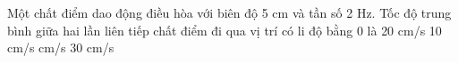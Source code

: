   
  \begin{ex}%
  	Một chất điểm dao động điều hòa với biên độ 5 cm và tần số 2 Hz. Tốc độ trung bình giữa hai lần liên tiếp chất điểm đi qua vị trí có li độ bằng 0 là
  	\choice
  	{20 cm/s}
  	{10 cm/s}
  	{ cm/s}
  	{30 cm/s}
  \end{ex} 
  
  
  
